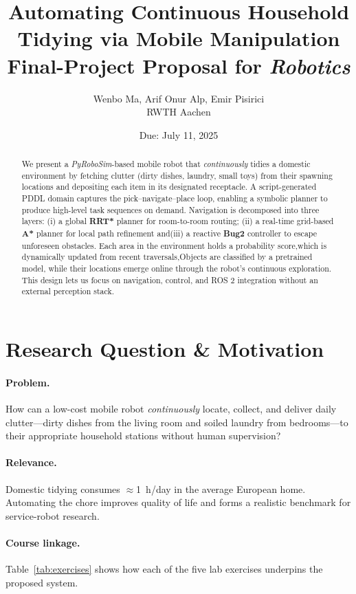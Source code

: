 \documentclass[11pt]{article}
\title{Automating Continuous Household Tidying via Mobile Manipulation\\[2pt]
\large Final-Project Proposal for {\it Robotics}}
\author{Wenbo Ma, Arif Onur Alp, Emir Pisirici\\
RWTH Aachen}
\date{Due: July 11, 2025}
\begin{document}
\maketitle

\begin{abstract}
We present a \textit{PyRoboSim}-based mobile robot that \emph{continuously} tidies a domestic environment by fetching clutter (dirty dishes, laundry, small toys) from their spawning locations and depositing each item in its designated receptacle.  A script-generated PDDL domain captures the pick--navigate--place loop, enabling a symbolic planner to produce high-level task sequences on demand.  Navigation is decomposed into three layers: (i) a global \textbf{RRT*} planner for room-to-room routing; (ii) a real-time grid-based \textbf{A*} planner for local path refinement and(iii) a reactive \textbf{Bug2} controller to escape unforeseen obstacles. Each area in the environment holds a probability score,which is dynamically updated from recent traversals,Objects are classified by a pretrained model, while their locations emerge online through the robot’s continuous exploration. This design lets us focus on navigation, control, and ROS 2 integration without an external perception stack.
\end{abstract}

\section{Research Question \& Motivation}

\paragraph{Problem.}
How can a low-cost mobile robot \emph{continuously} locate, collect, and deliver daily clutter---dirty dishes from the living room and soiled laundry from bedrooms---to their appropriate household stations without human supervision?

\paragraph{Relevance.}
Domestic tidying consumes $\approx$1~h/day in the average European home.  Automating the chore improves quality of life and forms a realistic benchmark for service-robot research.

\paragraph{Course linkage.}  Table~\ref{tab:exercises} shows how each of the five lab exercises underpins the proposed system.
\end{document}
